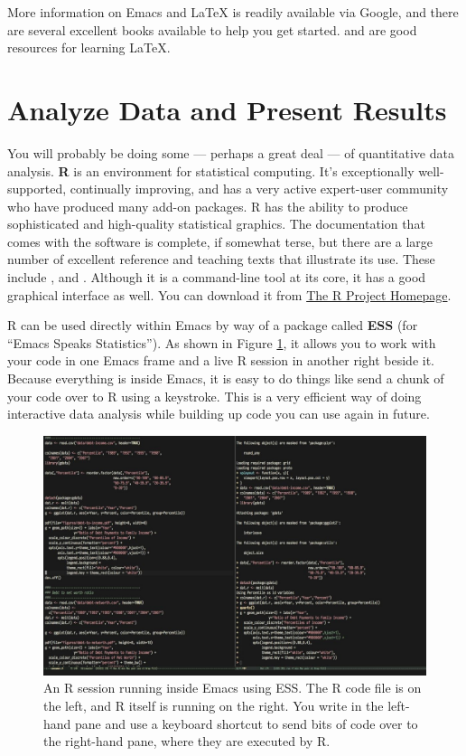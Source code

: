 \documentclass[11pt,article,oneside]{memoir}
\begin{document}
More information on Emacs and \LaTeX{} is readily available via Google,
and there are several excellent books available to help you get
started. \textcite{kopka03:_guide_latex} and
\textcite{mittlebach04:_latex_compan} are good resources for learning
\LaTeX{}.
     
\section*{Analyze Data and Present Results}
\label{sec-5}

You will probably be doing some --- perhaps a great deal --- of
quantitative data analysis. \textbf{R} is an environment for
statistical computing. It's exceptionally well-supported, continually
improving, and has a very active expert-user community who have
produced many add-on packages. R has the ability to produce
sophisticated and high-quality statistical graphics. The documentation
that comes with the software is complete, if somewhat terse, but there
are a large number of excellent reference and teaching texts that
illustrate its use. These include
\textcite{dalgaard02:_introd_statis_r,
  venables02:_moder_applied_statis_s_plus,
  maindonald03:_data_analy_graph_using_r,
  fox02:_r_s_plus_compan_applied_regres, frank01:_regres_model_strat},
and \textcite{gelmanhill07:data_analysis}. Although it is a
command-line tool at its core, it has a good graphical interface as
well. You can download it from \href{http://www.r-project.org/}{The R
  Project Homepage}.

R can be used directly within Emacs by way of a package called
\textbf{ESS} (for ``Emacs Speaks Statistics''). As shown in Figure
\ref{fig:ess}, it allows you to work with your code in one Emacs frame
and a live R session in another right beside it. Because everything is
inside Emacs, it is easy to do things like send a chunk of your code
over to R using a keystroke. This is a very efficient way of doing
interactive data analysis while building up code you can use again in
future.

\begin{figure}[htb]
\centering
\includegraphics[width=5in]{figures/ess-r-emacs.png}
\caption{\label{fig:ess}An R session running inside Emacs using ESS. The R code file is on the left, and R itself is running on the right. You write in the left-hand pane and use a keyboard shortcut to send bits of code over to the right-hand pane, where they are executed by R.}
\end{figure}
\end{document}
